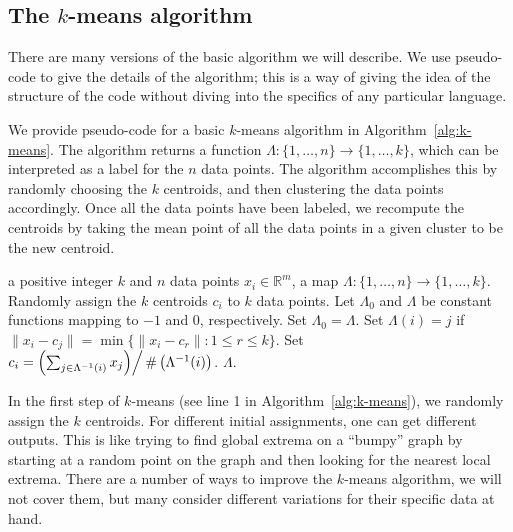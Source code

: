 \documentclass[a4paper, 12pt]{article}
\numberwithin{equation}{section}
\numberwithin{figure}{section}
\theoremstyle{definition}
\renewcommand{\leq}{\leqslant}
\newcommand{\R}{\mathbb{R}}
\begin{document}
\subsection{The $k$-means algorithm}

There are many versions of the basic algorithm we will describe. We use
pseudo-code to give the details of the algorithm; this is a way of giving the
idea of the structure of the code without diving into the specifics of any
particular language. 

We provide pseudo-code for a basic $k$-means algorithm in Algorithm~\ref{alg:k-means}.
The algorithm returns a function $\Lambda : \{1,\dots, n\} \to \{1,\dots, k\}$,
which can be interpreted as a label for the $n$ data points. The algorithm
accomplishes this by randomly choosing the $k$ centroids, and then clustering
the data points accordingly. Once all the data points have been labeled, we
recompute the centroids by taking the mean point of all the data points in a
given cluster to be the new centroid. 

\begin{algorithm}
	\caption{(Basic) $k$-means}\label{alg:k-means}
	\begin{algorithmic}[1]
		\Require a positive integer $k$ and $n$ data points $x_i\in\R^m$,
		\Ensure a map $\Lambda : \{1,\dots,n\} \to \{1,\dots, k\}$.
		\State Randomly assign the $k$ centroids $c_i$ to $k$ data points.
		\State Let $\Lambda_0$ and $\Lambda$ be constant functions mapping to $-1$ and $0$, respectively.
		\While{$\Lambda_0 \neq \Lambda$}
			\State Set $\Lambda_0 = \Lambda$.
				\State Set $\Lambda(i) = j$ if $\|x_i-c_j\| = \min\{\|x_i-c_r\| : 1\leq r \leq k\}$.
			\EndFor
				\State Set $c_i = \left(\sum_{j \in \Lambda^{-1}(i)} x_j\middle) \right/ \# \left(\Lambda^{-1}(i)\right)$.
			\EndFor
		\EndWhile
		\State \Return $\Lambda$.
	\end{algorithmic}
\end{algorithm}

In the first step of $k$-means (see line 1 in Algorithm~\ref{alg:k-means}), we randomly
assign the $k$ centroids. For different initial assignments, one can get
different outputs. This is like trying to find global extrema on a ``bumpy''
graph by starting at a random point on the graph and then looking for the
nearest local extrema. There are a number of ways to improve the $k$-means
algorithm, we will not cover them, but many consider different variations for
their specific data at hand. 
\end{document}
